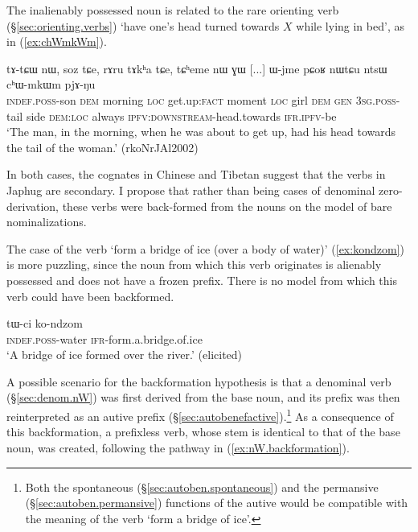 The inalienably possessed noun  is related to the rare orienting verb (§\ref{sec:orienting.verbs})  `have one's head turned towards $X$ while lying in bed', as in (\ref{ex:chWmkWm}).

\begin{exe}
\ex \label{ex:chWmkWm}
\gll  tɤ-tɕɯ nɯ, soz tɕe, rɤru tɤkʰa tɕe, tɕʰeme nɯ ɣɯ [...] ɯ-jme pɕoʁ nɯtɕu ntsɯ cʰɯ-mkɯm pjɤ-ŋu \\
\textsc{indef}.\textsc{poss}-son \textsc{dem} morning \textsc{loc} get.up:\textsc{fact} moment \textsc{loc} girl \textsc{dem} \textsc{gen} {  } \textsc{3sg}.\textsc{poss}-tail side \textsc{dem}:\textsc{loc} always \textsc{ipfv}:\textsc{downstream}-head.towards \textsc{ifr}.\textsc{ipfv}-be \\
\glt `The man, in the morning, when he was about to get up, had his head towards the tail of the woman.' (rkoNrJAl2002)
\end{exe}

In both cases, the cognates in Chinese and Tibetan suggest that the verbs in Japhug are secondary. I propose that rather than being cases of denominal zero-derivation, these verbs were back-formed from the nouns on the model of bare nominalizations.

The case of the verb  `form a bridge of ice (over a body of water)' (\ref{ex:kondzom}) is more puzzling, since the noun  from which this verb originates is alienably possessed and does not have a frozen  prefix. There is no model from which this verb could have been backformed. 

\begin{exe}
\ex \label{ex:kondzom}
\gll  tɯ-ci ko-ndzom \\
\textsc{indef}.\textsc{poss}-water \textsc{ifr}-form.a.bridge.of.ice \\
\glt `A bridge of ice formed over the river.' (elicited)
\end{exe}

A possible scenario for the backformation hypothesis is that a  denominal verb (§\ref{sec:denom.nW}) was first derived from the base noun, and its  prefix was then reinterpreted as an autive prefix (§\ref{sec:autobenefactive}).\footnote{Both the spontaneous (§\ref{sec:autoben.spontaneous}) and the permansive (§\ref{sec:autoben.permansive}) functions of the autive would be compatible with the meaning of the verb  `form a bridge of ice'.} As a consequence of this backformation, a prefixless verb, whose stem is identical to that of the base noun, was created, following the pathway in (\ref{ex:nW.backformation}).

